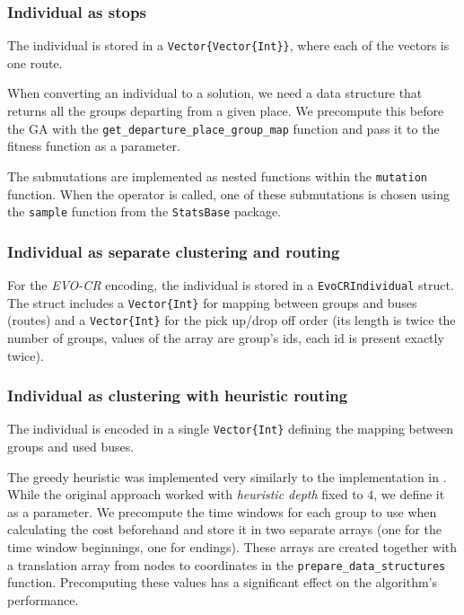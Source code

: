 \subsubsection{Individual as stops}

The individual is stored in a \texttt{Vector\{Vector\{Int\}\}}, where each of the vectors is one route.

When converting an individual to a solution, we need a data structure that returns all the groups departing from a given place. We precompute this before the GA with the \texttt{get\_departure\_place\_group\_map} function and pass it to the fitness function as a parameter.

The submutations are implemented as nested functions within the \texttt{mutation} function. When the operator is called, one of these submutations is chosen using the \texttt{sample} function from the \texttt{StatsBase} package.

\subsubsection{Individual as separate clustering and routing}

For the \textit{EVO-CR} encoding, the individual is stored in a \texttt{EvoCRIndividual} struct. The struct includes a \texttt{Vector\{Int\}} for mapping between groups and buses (routes) and a \texttt{Vector\{Int\}} for the pick up/drop off order (its length is twice the number of groups, values of the array are group's ids, each id is present exactly twice).

\subsubsection{Individual as clustering with heuristic routing}

The individual is encoded in a single \texttt{Vector\{Int\}} defining the mapping between groups and used buses.

The greedy heuristic was implemented very similarly to the implementation in \cite{Baugh1998INTRACTABILITYOT}. While the original approach worked with \textit{heuristic depth} fixed to $4$, we define it as a parameter. We precompute the time windows for each group to use when calculating the cost beforehand and store it in two separate arrays (one for the time window beginnings, one for endings). These arrays are created together with a translation array from nodes to coordinates in the \texttt{prepare\_data\_structures} function. Precomputing these values has a significant effect on the algorithm's performance.

